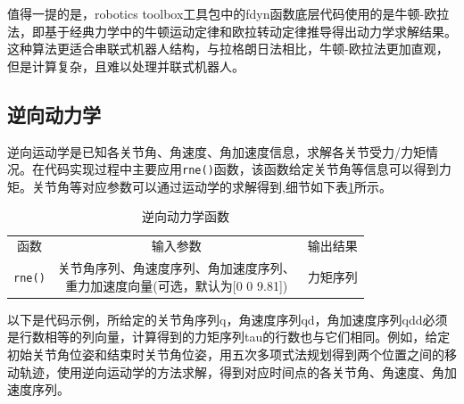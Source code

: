 \documentclass[12pt]{ctexart}
\begin{document}
值得一提的是，robotics toolbox工具包中的fdyn函数底层代码使用的是牛顿-欧拉法，即基于经典力学中的牛顿运动定律和欧拉转动定律推导得出动力学求解结果。这种算法更适合串联式机器人结构，与拉格朗日法相比，牛顿-欧拉法更加直观，但是计算复杂，且难以处理并联式机器人。
\newpage
\subsection{逆向动力学}
逆向运动学是已知各关节角、角速度、角加速度信息，求解各关节受力/力矩情况。在代码实现过程中主要应用\verb|rne()|函数，该函数给定关节角等信息可以得到力矩。关节角等对应参数可以通过运动学的求解得到,细节如下表\ref{tab:rne}所示。

\begin{table}[htbp]
    \centering
    \caption{逆向动力学函数}
    \label{tab:rne}
    \vspace{5pt}
    \begin{tabular}{ccc}
    \rowcolor[HTML]{5B9BD5} 
    函数                            & 输入参数                  & 输出结果                      \\
    \rowcolor[HTML]{BDD6EE} 
    \cellcolor[HTML]{5B9BD5}\verb|rne()|  & \makecell[c]{关节角序列、角速度序列、角加速度序列、\\重力加速度向量(可选，默认为[0 0 9.81])}          &  力矩序列\\                
    \end{tabular}
\end{table}

以下是代码示例，所给定的关节角序列q，角速度序列qd，角加速度序列qdd必须是行数相等的列向量，计算得到的力矩序列tau的行数也与它们相同。例如，给定初始关节角位姿和结束时关节角位姿，用五次多项式法规划得到两个位置之间的移动轨迹，使用逆向运动学的方法求解，得到对应时间点的各关节角、角速度、角加速度序列。
\end{document}
